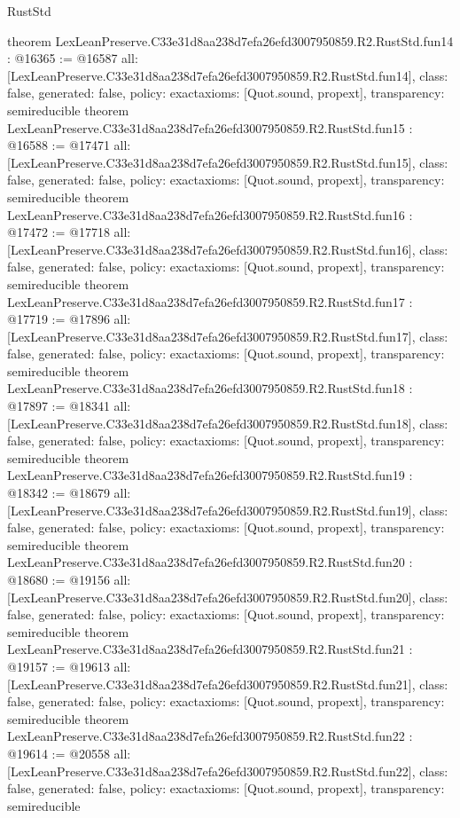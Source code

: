 \begin{lexlean}{RustStd}
\begin{coremodule}
{}
theorem LexLeanPreserve.C33e31d8aa238d7efa26efd3007950859.R2.RustStd.fun14 : @16365 := @16587 {
  all: [LexLeanPreserve.C33e31d8aa238d7efa26efd3007950859.R2.RustStd.fun14],
  class: false,
  generated: false,
  policy: exact{axioms: [Quot.sound, propext]},
  transparency: semireducible
}
theorem LexLeanPreserve.C33e31d8aa238d7efa26efd3007950859.R2.RustStd.fun15 : @16588 := @17471 {
  all: [LexLeanPreserve.C33e31d8aa238d7efa26efd3007950859.R2.RustStd.fun15],
  class: false,
  generated: false,
  policy: exact{axioms: [Quot.sound, propext]},
  transparency: semireducible
}
theorem LexLeanPreserve.C33e31d8aa238d7efa26efd3007950859.R2.RustStd.fun16 : @17472 := @17718 {
  all: [LexLeanPreserve.C33e31d8aa238d7efa26efd3007950859.R2.RustStd.fun16],
  class: false,
  generated: false,
  policy: exact{axioms: [Quot.sound, propext]},
  transparency: semireducible
}
theorem LexLeanPreserve.C33e31d8aa238d7efa26efd3007950859.R2.RustStd.fun17 : @17719 := @17896 {
  all: [LexLeanPreserve.C33e31d8aa238d7efa26efd3007950859.R2.RustStd.fun17],
  class: false,
  generated: false,
  policy: exact{axioms: [Quot.sound, propext]},
  transparency: semireducible
}
theorem LexLeanPreserve.C33e31d8aa238d7efa26efd3007950859.R2.RustStd.fun18 : @17897 := @18341 {
  all: [LexLeanPreserve.C33e31d8aa238d7efa26efd3007950859.R2.RustStd.fun18],
  class: false,
  generated: false,
  policy: exact{axioms: [Quot.sound, propext]},
  transparency: semireducible
}
theorem LexLeanPreserve.C33e31d8aa238d7efa26efd3007950859.R2.RustStd.fun19 : @18342 := @18679 {
  all: [LexLeanPreserve.C33e31d8aa238d7efa26efd3007950859.R2.RustStd.fun19],
  class: false,
  generated: false,
  policy: exact{axioms: [Quot.sound, propext]},
  transparency: semireducible
}
theorem LexLeanPreserve.C33e31d8aa238d7efa26efd3007950859.R2.RustStd.fun20 : @18680 := @19156 {
  all: [LexLeanPreserve.C33e31d8aa238d7efa26efd3007950859.R2.RustStd.fun20],
  class: false,
  generated: false,
  policy: exact{axioms: [Quot.sound, propext]},
  transparency: semireducible
}
theorem LexLeanPreserve.C33e31d8aa238d7efa26efd3007950859.R2.RustStd.fun21 : @19157 := @19613 {
  all: [LexLeanPreserve.C33e31d8aa238d7efa26efd3007950859.R2.RustStd.fun21],
  class: false,
  generated: false,
  policy: exact{axioms: [Quot.sound, propext]},
  transparency: semireducible
}
theorem LexLeanPreserve.C33e31d8aa238d7efa26efd3007950859.R2.RustStd.fun22 : @19614 := @20558 {
  all: [LexLeanPreserve.C33e31d8aa238d7efa26efd3007950859.R2.RustStd.fun22],
  class: false,
  generated: false,
  policy: exact{axioms: [Quot.sound, propext]},
  transparency: semireducible
}
\end{coremodule}
\end{lexlean}
